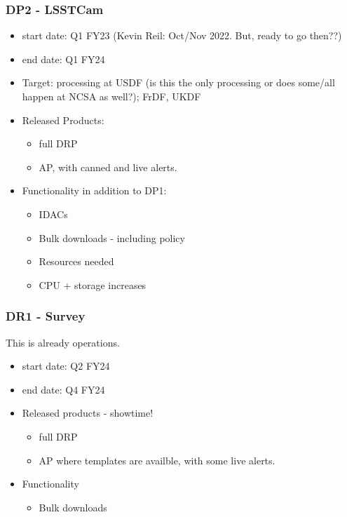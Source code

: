\subsubsection{DP2 - LSSTCam}
\begin{itemize}
\item start date: Q1 FY23 (Kevin Reil: Oct/Nov 2022. But, ready to go then??)
\item end date: Q1 FY24
\item Target: processing at USDF (is this the only processing or does some/all happen at NCSA as well?); FrDF, UKDF
\item Released Products:
\begin{itemize}
\item full DRP
\item AP, with canned and live alerts.
\end{itemize}
\item Functionality in addition to DP1:
\begin{itemize}
\item IDACs
\item Bulk downloads - including policy
\item Resources needed
\item CPU + storage increases
\end{itemize}
\end{itemize}
\subsubsection{DR1 - Survey}
This is already operations.

\begin{itemize}
\item start date: Q2 FY24
\item end date: Q4 FY24
\item Released products - showtime!
\begin{itemize}
\item full DRP
\item AP where templates are availble, with some live alerts.
\end{itemize}
\item Functionality
\begin{itemize}
\item Bulk downloads
\end{itemize}
\end{itemize}
